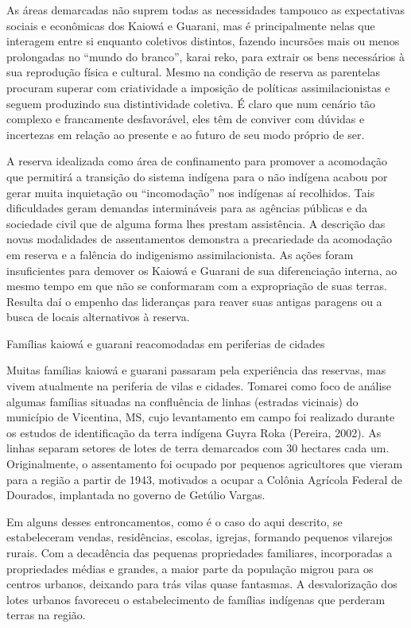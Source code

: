 As áreas demarcadas não suprem todas as necessidades tampouco as
expectativas sociais e econômicas dos Kaiowá e Guarani, mas é
principalmente nelas que interagem entre si enquanto coletivos
distintos, fazendo incursões mais ou menos prolongadas no ``mundo do
branco'', karai reko, para extrair os bens necessários à sua reprodução
física e cultural. Mesmo na condição de reserva as parentelas procuram
superar com criatividade a imposição de políticas assimilacionistas e
seguem produzindo sua distintividade coletiva. É claro que num cenário
tão complexo e francamente desfavorável, eles têm de conviver com
dúvidas e incertezas em relação ao presente e ao futuro de seu modo
próprio de ser. 

A reserva idealizada como área de confinamento para promover a
acomodação que permitirá a transição do sistema indígena para o não
indígena acabou por gerar muita inquietação ou ``incomodação'' nos
indígenas aí recolhidos. Tais dificuldades geram demandas intermináveis
para as agências públicas e da sociedade civil que de alguma forma lhes
prestam assistência. A descrição das novas modalidades de assentamentos
demonstra a precariedade da acomodação em reserva e a falência do
indigenismo assimilacionista. As ações foram insuficientes para demover
os Kaiowá e Guarani de sua diferenciação interna, ao mesmo tempo em que
não se conformaram com a expropriação de suas terras. Resulta daí o
empenho das lideranças para reaver suas antigas paragens ou a busca de
locais alternativos à reserva.

Famílias kaiowá e guarani reacomodadas em periferias de cidades

Muitas famílias kaiowá e guarani passaram pela experiência das reservas,
mas vivem atualmente na periferia de vilas e cidades. Tomarei como foco
de análise algumas famílias situadas na confluência de linhas (estradas
vicinais) do município de Vicentina, MS, cujo levantamento em campo foi
realizado durante os estudos de identificação da terra indígena Guyra
Roka (Pereira, 2002). As linhas separam setores de lotes de terra
demarcados com 30 hectares cada um. Originalmente, o assentamento foi
ocupado por pequenos agricultores que vieram para a região a partir de
1943, motivados a ocupar a Colônia Agrícola Federal de Dourados,
implantada no governo de Getúlio Vargas.

Em alguns desses entroncamentos, como é o caso do aqui descrito, se
estabeleceram vendas, residências, escolas, igrejas, formando pequenos
vilarejos rurais. Com a decadência das pequenas propriedades
familiares, incorporadas a propriedades médias e grandes, a maior parte
da população migrou para os centros urbanos, deixando para trás vilas
quase fantasmas. A desvalorização dos lotes urbanos favoreceu o
estabelecimento de famílias indígenas que perderam terras na região.

